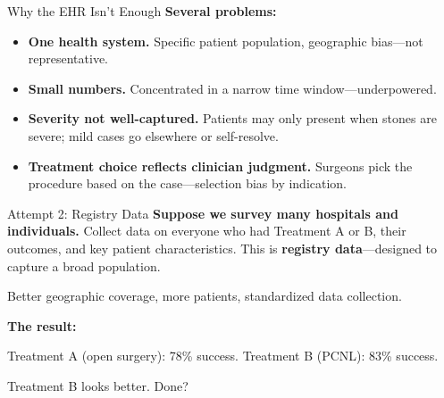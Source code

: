 \documentclass[aspectratio=169,10pt]{beamer}
\begin{document}
\begin{frame}{Why the EHR Isn't Enough}
\textbf{Several problems:}
\begin{itemize}[<+->]
    \item \textbf{One health system.} Specific patient population, geographic bias---not representative.
    \item \textbf{Small numbers.} Concentrated in a narrow time window---underpowered.
    \item \textbf{Severity not well-captured.} Patients may only present when stones are severe; mild cases go elsewhere or self-resolve.
    \item \textbf{Treatment choice reflects clinician judgment.} Surgeons pick the procedure based on the case---selection bias by indication.
\end{itemize}

\end{frame}

\begin{frame}{Attempt 2: Registry Data}
\textbf{Suppose we survey many hospitals and individuals.} Collect data on everyone who had Treatment A or B, their outcomes, and key patient characteristics. This is \textbf{registry data}---designed to capture a broad population.

\vspace{0.3em}
Better geographic coverage, more patients, standardized data collection.

\vspace{0.3em}
\pause
\textbf{The result:}
\begin{center}
{\small Treatment A (open surgery): 78\% success. \quad Treatment B (PCNL): 83\% success.}
\end{center}

\vspace{0.1em}
Treatment B looks better. Done?
\end{frame}
\end{document}
